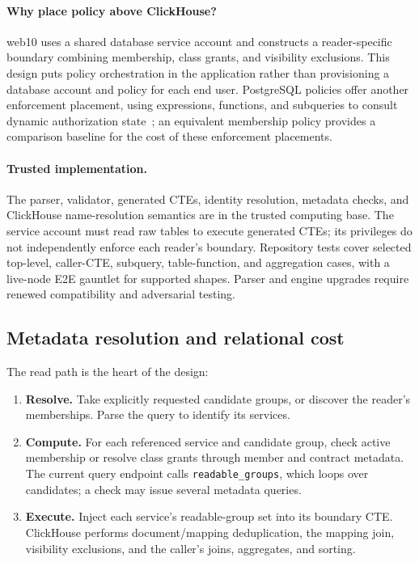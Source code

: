 \documentclass[sigconf, nonacm]{acmart}
\begin{document}
\paragraph{Why place policy above ClickHouse?} web10 uses a shared database
service account and constructs a reader-specific boundary combining membership,
class grants, and visibility exclusions. This design puts policy orchestration
in the application rather than provisioning a database account and policy for
each end user. PostgreSQL policies offer another enforcement placement, using
expressions, functions, and
subqueries to consult dynamic authorization state~\cite{postgres-rls}; an
equivalent membership policy provides a comparison baseline for the cost of
these enforcement placements.

\paragraph{Trusted implementation.} The parser, validator, generated CTEs,
identity resolution, metadata checks, and ClickHouse name-resolution semantics
are in the trusted computing base. The service account must read raw tables to
execute generated CTEs; its privileges do not independently enforce each
reader's boundary. Repository tests cover selected top-level, caller-CTE,
subquery, table-function, and aggregation cases, with a live-node E2E gauntlet
for supported shapes. Parser and engine upgrades require renewed
compatibility and adversarial testing.

\subsection{Metadata resolution and relational cost}

The read path is the heart of the design:

\begin{enumerate}[leftmargin=*,nosep]
  \item \textbf{Resolve.} Take explicitly requested candidate groups, or
  discover the reader's memberships. Parse the query to identify its services.
  \item \textbf{Compute.} For each referenced service and candidate group,
  check active membership or resolve class grants through member and contract
  metadata. The current query endpoint calls \texttt{readable\_groups}, which
  loops over candidates; a check may issue several metadata queries.
  \item \textbf{Execute.} Inject each service's readable-group set into its
  boundary CTE. ClickHouse performs document/mapping deduplication, the mapping
  join, visibility exclusions, and the caller's joins, aggregates, and sorting.
\end{enumerate}
\end{document}
